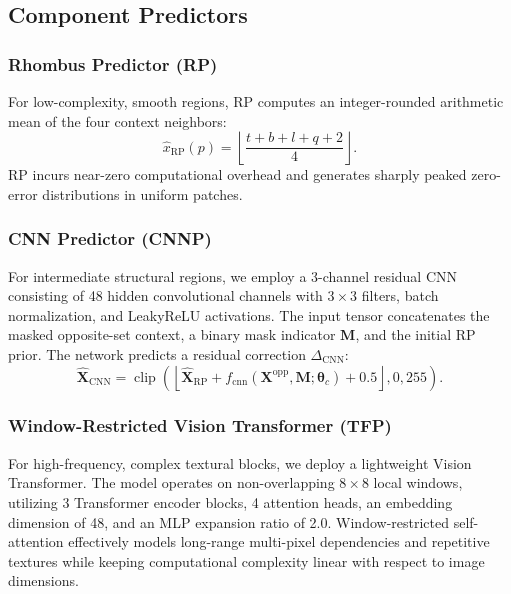 \documentclass[conference]{IEEEtran}
\begin{document}
\subsection{Component Predictors}

\subsubsection{Rhombus Predictor (RP)}
For low-complexity, smooth regions, RP computes an integer-rounded arithmetic mean of the four context neighbors:
\begin{equation}
\hat{x}_{\mathrm{RP}}(p) = \left\lfloor \frac{t + b + l + q + 2}{4} \right\rfloor.
\label{eq:rp}
\end{equation}
RP incurs near-zero computational overhead and generates sharply peaked zero-error distributions in uniform patches.

\subsubsection{CNN Predictor (CNNP)}
For intermediate structural regions, we employ a 3-channel residual CNN consisting of 48 hidden convolutional channels with $3 \times 3$ filters, batch normalization, and LeakyReLU activations. The input tensor concatenates the masked opposite-set context, a binary mask indicator $\mathbf{M}$, and the initial RP prior. The network predicts a residual correction $\Delta_{\mathrm{CNN}}$:
\begin{equation}
\hat{\mathbf{X}}_{\mathrm{CNN}} = \operatorname{clip}\left(\left\lfloor \hat{\mathbf{X}}_{\mathrm{RP}} + f_{\mathrm{cnn}}(\mathbf{X}^{\mathrm{opp}}, \mathbf{M}; \boldsymbol{\theta}_c) + 0.5 \right\rfloor, 0, 255\right).
\label{eq:cnn}
\end{equation}

\subsubsection{Window-Restricted Vision Transformer (TFP)}
For high-frequency, complex textural blocks, we deploy a lightweight Vision Transformer. The model operates on non-overlapping $8 \times 8$ local windows, utilizing 3 Transformer encoder blocks, 4 attention heads, an embedding dimension of 48, and an MLP expansion ratio of 2.0. Window-restricted self-attention effectively models long-range multi-pixel dependencies and repetitive textures while keeping computational complexity linear with respect to image dimensions.
\end{document}
